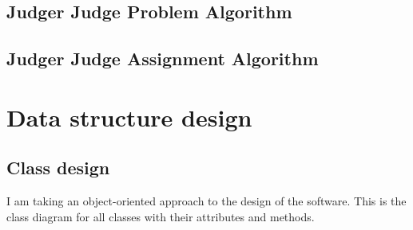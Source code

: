 \documentclass[a4paper]{report}
\begin{document}
\subsection{Judger Judge Problem Algorithm}

\subsection{Judger Judge Assignment Algorithm}

\section{Data structure design}

\subsection{Class design}

I am taking an object-oriented approach to the design of the software. This is the class diagram for all classes with their attributes and methods.
\end{document}
